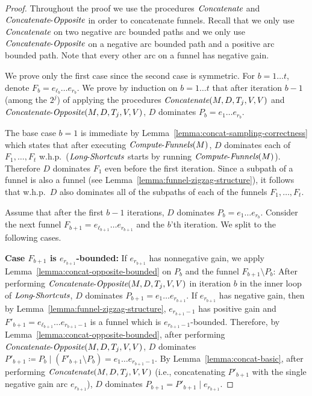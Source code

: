 \documentclass[11pt]{article}
\newcommand{\Concat}{\mbox{{\it Concatenate}}}
\newcommand{\CO}{\mbox{{\it Concatenate}-{\it Opposite}}}
\newcommand{\LS}{\mbox{{\it Long}-{\it Shortcuts}}}
\newcommand{\ComputeF}{\mbox{{\it Compute}-{\it Funnels}}}
\begin{document}
\begin{proof}
    Throughout the proof we use the procedures $\Concat$ and $\CO$ in order to concatenate funnels. Recall that we only use $\Concat$ on two negative arc bounded paths and we only use $\CO$ on a negative arc bounded path and a positive arc bounded path.  Note that every other arc on a funnel has negative gain.
    
    We prove only the first case since the second case is symmetric. For $b=1\ldots t$, denote $F_b = e_{\ell_{b}}\ldots e_{r_{b}}$. We prove by induction on $b=1\ldots t$ that after iteration $b-1$ (among the $2^j$) of applying the procedures $\Concat(M,D,T_j,V,V)$ and $\CO(M,D,T_j,V,V)$, $D$ dominates $P_b = e_1 \ldots e_{r_{b}}$.

    The base case $b=1$ is immediate by Lemma~\ref{lemma:concat-sampling-correctness} which states that after executing $\ComputeF(M)$,   $D$ dominates each of $F_1,\ldots, F_t$  w.h.p.\ ($\LS$ starts by running $\ComputeF(M)$). Therefore $D$ dominates $F_1$ even before the first iteration. Since a subpath of a funnel is also a funnel (see Lemma~\ref{lemma:funnel-zigzag-structure}), it follows that w.h.p.\ $D$ also dominates all of the subpaths of each of the funnels $F_1,\ldots, F_t$.

    Assume that after the first $b-1$ iterations, $D$ dominates $P_b=e_1 \ldots e_{r_b}$. Consider the next funnel $F_{b+1} = e_{\ell_{b+1}}\ldots e_{r_{b+1}}$ 
    and the $b$'th iteration. We split to the following cases.

    \textbf{Case $F_{b+1}$ is $e_{r_{b+1}}$-bounded:} If $e_{r_{b+1}}$ has nonnegative gain, we apply Lemma~\ref{lemma:concat-opposite-bounded} on $P_b$ and the funnel $F_{b+1} \setminus P_b$: After performing $\CO(M,D,T_j,V,V)$ in iteration $b$ in the inner loop of $\LS$, $D$ dominates $P_{b+1} = e_1 \ldots e_{r_{b+1}}$. If $e_{r_{b+1}}$ has negative gain,  then by Lemma~\ref{lemma:funnel-zigzag-structure}, $e_{r_{b+1}-1}$ has positive gain and $F'_{b+1} = e_{\ell_{b+1}} \ldots e_{r_{b+1}-1}$ is a funnel which is $e_{r_{b+1}-1}$-bounded. Therefore, by Lemma~\ref{lemma:concat-opposite-bounded}, after performing $\CO(M,D,T_j,V,V)$, $D$ dominates $P'_{b+1} \coloneq P_b \mid (F'_{b+1}\setminus P_b) = e_1 \ldots e_{r_{b+1}-1}$. By Lemma~\ref{lemma:concat-basic}, after performing $\Concat(M,D,T_j,V,V)$ (i.e., concatenating $P'_{b+1}$ with the single negative gain arc $e_{r_{b+1}}$), $D$ dominates $P_{b+1}=  P'_{b+1} \mid e_{r_{b+1}}$.
    

\end{proof}
\end{document}
